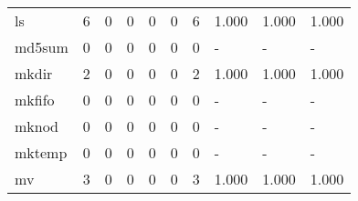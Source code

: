 \begin{longtable}{lp{2.0cm}p{2.0cm}p{2.0cm}p{2.0cm}p{2.0cm}p{2.0cm}p{2.0cm}p{2.0cm}p{2.0cm}}
ls        &                      6 &                                             0 &                                            0 &                                           0 &                                            0 &                                          6 &                                1.000 &                                  1.000 &                                1.000 \\
md5sum    &                      0 &                                             0 &                                            0 &                                           0 &                                            0 &                                          0 &                                    - &                                      - &                                    - \\
mkdir     &                      2 &                                             0 &                                            0 &                                           0 &                                            0 &                                          2 &                                1.000 &                                  1.000 &                                1.000 \\
mkfifo    &                      0 &                                             0 &                                            0 &                                           0 &                                            0 &                                          0 &                                    - &                                      - &                                    - \\
mknod     &                      0 &                                             0 &                                            0 &                                           0 &                                            0 &                                          0 &                                    - &                                      - &                                    - \\
mktemp    &                      0 &                                             0 &                                            0 &                                           0 &                                            0 &                                          0 &                                    - &                                      - &                                    - \\
mv        &                      3 &                                             0 &                                            0 &                                           0 &                                            0 &                                          3 &                                1.000 &                                  1.000 &                                1.000 \\

\end{longtable}
